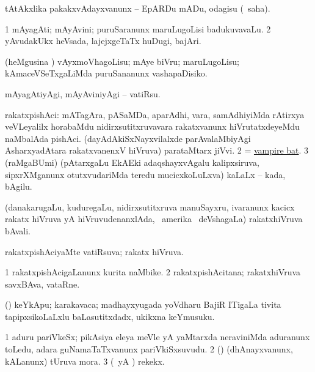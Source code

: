 \noindent 
\gl{\akirx}
\expl{}
\bmng
 tAtAkxlika pakakxvAdayxvanunx -- EpARDu mADu, odagisu (\sakirx\ saha). 
\emng
\eentry

\bentry
{} 
\gl{\nA}
\expl{}
\bmng
\bnum
\num{1} mAyagAti; mAyAvini; puruSaranunx maruLugoLisi badukuvavaLu. 
\num{2} yAvudakUkx heVsada, lajejxgeTaTx huDugi, bajAri. 
\enum
\emng
\eentry

\bentry
{} 
\gl{\sakirx}
\expl{}
\bmng
 (heMgusina \vi) vAyxmoVhagoLisu; mAye biVru; maruLugoLisu; kAmaceVSeTxgaLiMda puruSananunx vashapaDisiko. 
\emng

\noindent
\gl{\akirx}
\bmng
mAyagAtiyAgi, mAyAviniyAgi -- vatiRsu. 
\emng
\eentry

\bentry
{} 
\gl{\nA}
\expl{}
\bmng
\bnum
{} rakatxpishAci: 
\banum
{} mATagAra, pASaMDa, aparAdhi, \mo vara, samAdhiyiMda rAtirxya veVLeyalilx horabaMdu nidirxsutitxruvavara rakatxvanunx hiVrutatxdeyeMdu naMbalAda pishAci. 
 (dayAdAkiSxNayxvilalxde parAvalaMbiyAgi AsharxyadAtara rakatxvanenxV hiVruva) parataMtarx jiVvi. 
\eanum
\numie
\num{2} = \hyperlink{vampire bat}{vampire bat}. 
\num{3} (raMgaBUmi) (pAtarxgaLu EkAEki adaqshayxvAgalu kalipxsiruva, sipxrXMganunx otutxvudariMda teredu mucicxkoLuLxva) kaLaLx -- kada, bAgilu. 
\enum
\emng
\eentry

\bentry
{}
\gl{\nA}
\expl{}
\bmng
 (danakarugaLu, kuduregaLu, nidirxsutitxruva manuSayxru, ivaranunx kacicx rakatx hiVruva yA hiVruvudenanxlAda, \da\ amerika \mo\ deVshagaLa) rakatxhiVruva bAvali. 
\emng
\eentry

\bentry
{} 
\gl{\gu}
\expl{}
\bmng
rakatxpishAciyaMte vatiRsuva; rakatx hiVruva. 
\emng
\eentry

\bentry
{} 
\gl{\nA}
\expl{}
\bmng
\bnum
\num{1} rakatxpishAcigaLanunx kurita naMbike. 
\num{2} rakatxpishAcitana; rakatxhiVruva savxBAva, vataRne. 
\enum
\emng
\eentry

\bentry
{} 
\gl{\nA}
\expl{}
\bmng
 (\ca) keYkApu; karakavaca; madhayxyugada yoVdharu BajiR ITigaLa tivita tapipxsikoLaLxlu baLasutitxdadx, ukikxna keYmusuku. 
\emng
\eentry

\bentry
{} 
\gl{\nA}
\expl{}
\bmng
\bnum
\num{1} aduru pariVkeSx; pikAsiya eleya meVle yA yaMtarxda neraviniMda aduranunx toLedu, adara guNamaTaTxvanunx pariVkiSxsuvudu. 
\num{2} (\pArxparx) (dhAnayxvanunx, kALanunx) tUruva mora. 
\num{3} (\pArxparx\ yA \kAparx) rekekx. 
\enum
\emng
\eentry

